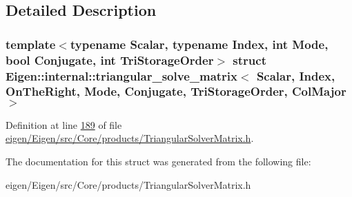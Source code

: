 \subsection{Detailed Description}
\subsubsection*{template$<$typename Scalar, typename Index, int Mode, bool Conjugate, int Tri\+Storage\+Order$>$\newline
struct Eigen\+::internal\+::triangular\+\_\+solve\+\_\+matrix$<$ Scalar, Index, On\+The\+Right, Mode, Conjugate, Tri\+Storage\+Order, Col\+Major $>$}



Definition at line \hyperlink{eigen_2_eigen_2src_2_core_2products_2_triangular_solver_matrix_8h_source_l00189}{189} of file \hyperlink{eigen_2_eigen_2src_2_core_2products_2_triangular_solver_matrix_8h_source}{eigen/\+Eigen/src/\+Core/products/\+Triangular\+Solver\+Matrix.\+h}.



The documentation for this struct was generated from the following file\+:\begin{DoxyCompactItemize}
\item 
eigen/\+Eigen/src/\+Core/products/\+Triangular\+Solver\+Matrix.\+h\end{DoxyCompactItemize}
